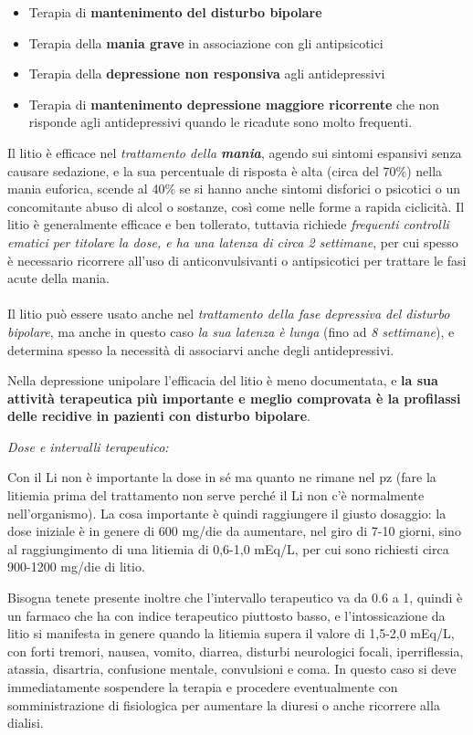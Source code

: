 \begin{itemize}
\begin{itemize}
\item
  Terapia di \textbf{mantenimento del disturbo bipolare}
\item
  Terapia della \textbf{mania grave} in associazione con gli
  antipsicotici
\item
  Terapia della \textbf{depressione non responsiva} agli antidepressivi
\item
  Terapia di \textbf{mantenimento depressione maggiore ricorrente} che
  non risponde agli antidepressivi quando le ricadute sono molto
  frequenti.
\end{itemize}

Il litio è efficace nel \emph{trattamento della \textbf{mania}}, agendo
sui sintomi espansivi senza causare sedazione, e la sua percentuale di
risposta è alta (circa del 70\%) nella mania euforica, scende al 40\% se
si hanno anche sintomi disforici o psicotici o un concomitante abuso di
alcol o sostanze, così come nelle forme a rapida ciclicità. Il litio è
generalmente efficace e ben tollerato, tuttavia richiede \emph{frequenti
controlli ematici per titolare la dose, e ha una latenza di circa 2
settimane}, per cui spesso è necessario ricorrere all'uso di
anticonvulsivanti o antipsicotici per trattare le fasi acute della
mania.
\\\\
Il litio può essere usato anche nel \emph{trattamento della fase
depressiva del disturbo bipolare}, ma anche in questo caso \emph{la sua
latenza è lunga} (fino ad \emph{8 settimane}), e determina spesso la
necessità di associarvi anche degli antidepressivi.

Nella depressione unipolare l'efficacia del litio è meno documentata, e
\textbf{la sua attività terapeutica più importante e meglio comprovata è
la profilassi delle recidive in pazienti con disturbo bipolare}.

\emph{\emph{Dose e intervalli terapeutico:}}

Con il Li non è importante la dose in sé ma quanto ne rimane nel pz
(fare la litiemia prima del trattamento non serve perché il Li non c'è
normalmente nell'organismo). La cosa importante è quindi raggiungere il
giusto dosaggio: la dose iniziale è in genere di 600 mg/die da
aumentare, nel giro di 7-10 giorni, sino al raggiungimento di una
litiemia di 0,6-1,0 mEq/L, per cui sono richiesti circa 900-1200 mg/die
di litio.

Bisogna tenete presente inoltre che l'intervallo terapeutico va da 0.6 a
1, quindi è un farmaco che ha con indice terapeutico piuttosto basso, e
l'intossicazione da litio si manifesta in genere quando la litiemia
supera il valore di 1,5-2,0 mEq/L, con forti tremori, nausea, vomito,
diarrea, disturbi neurologici focali, iperriflessia, atassia, disartria,
confusione mentale, convulsioni e coma. In questo caso si deve
immediatamente sospendere la terapia e procedere eventualmente con
somministrazione di fisiologica per aumentare la diuresi o anche
ricorrere alla dialisi.


\end{itemize}

